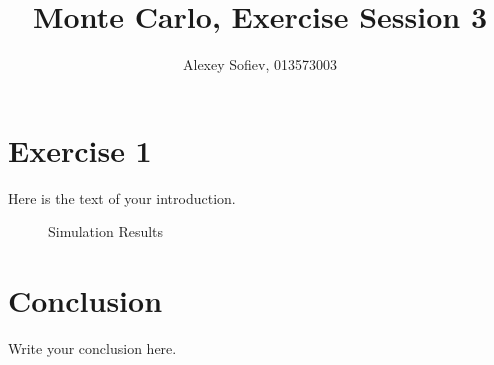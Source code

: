 \documentclass{article}
\begin{document}
\title{Monte Carlo, Exercise Session 3}
\author{Alexey Sofiev, 013573003}

\maketitle


\section{Exercise 1}
Here is the text of your introduction.


\begin{figure}
    \centering
    \caption{Simulation Results}
    \label{fig:ex1_answer}
\end{figure}

\section{Conclusion}
Write your conclusion here.
\end{document}
